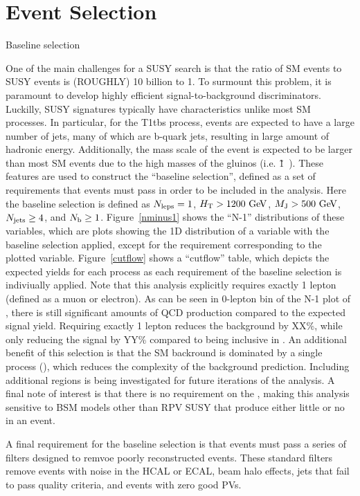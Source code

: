 \chapter{Event Selection}

\begin{section}{Baseline selection}

One of the main challenges for a SUSY search is that the ratio of SM events to SUSY events is (ROUGHLY) 10 billion to 1.
To surmount this problem, it is paramount to develop highly efficient signal-to-background discriminators.
Luckilly, SUSY signatures typically have characteristics unlike most SM processes.
In particular, for the T1tbs process, events are expected to have a large number of jets, many of which are b-quark jets, resulting in large amount of hadronic energy.
Additionally, the mass scale of the event is expected to be larger than most SM events due to the high masses of the gluinos (i.e. \~1~\TeV).
These features are used to construct the ``baseline selection'', defined as a set of requirements that events must pass in order to be included in the analysis.
Here the baseline selection is defined as $N_{\mathrm{leps}} = 1$, $H_{\mathrm{T}} > 1200~\mathrm{Ge\kern -0.1em V}$, $M_{\mathrm{J}} > 500~\mathrm{Ge\kern -0.1em V}$, $N_{\mathrm{jets}} \geq 4$, and $N_{\mathrm{b}} \geq 1$.
Figure~\ref{nminus1} shows the ``N-1'' distributions of these variables, which are plots showing the 1D distribution of a variable with the baseline selection applied, except for the requirement corresponding to the plotted variable.
Figure~\ref{cutflow} shows a ``cutflow'' table, which depicts the expected yields for each process as each requirement of the baseline selection is indiviually applied.
Note that this analysis explicitly requires exactly 1 lepton (defined as a muon or electron).
As can be seen in 0-lepton bin of the N-1 plot of \Nleps, there is still significant amounts of QCD production compared to the expected signal yield.
Requiring exactly 1 lepton reduces the background by XX\%, while only reducing the signal by YY\% compared to being inclusive in \Nleps.
An additional benefit of this selection is that the SM backround is dominated by a single process (\ttbar), which reduces the complexity of the background prediction.
Including additional \Nleps regions is being investigated for future iterations of the analysis.
A final note of interest is that there is no requirement on the \MET, making this analysis sensitive to BSM models other than RPV SUSY that produce either little or no \MET in an event.

A final requirement for the baseline selection is that events must pass a series of filters designed to remvoe poorly reconstructed events. These standard filters remove events with noise in the HCAL or ECAL, beam halo effects, jets that fail to pass quality criteria, and events with zero good PVs.

\end{section}

